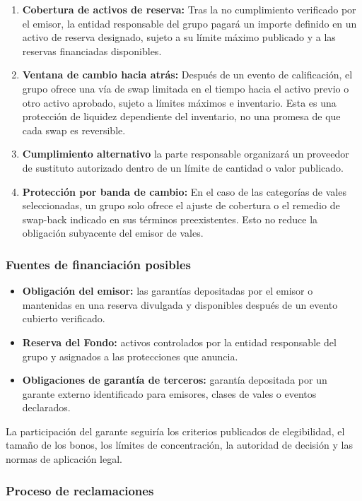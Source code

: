 \documentclass[11pt]{article}
\begin{document}
\begin{enumerate}[leftmargin=*]
\item \textbf{Cobertura de activos de reserva:} Tras la no cumplimiento verificado por el emisor, la entidad responsable del grupo pagará un importe definido en un activo de reserva designado, sujeto a su límite máximo publicado y a las reservas financiadas disponibles.
\item \textbf{Ventana de cambio hacia atrás:} Después de un evento de calificación, el grupo ofrece una vía de swap limitada en el tiempo hacia el activo previo o otro activo aprobado, sujeto a límites máximos e inventario. Esta es una protección de liquidez dependiente del inventario, no una promesa de que cada swap es reversible.
\item \textbf{Cumplimiento alternativo} la parte responsable organizará un proveedor de sustituto autorizado dentro de un límite de cantidad o valor publicado.
\item \textbf{Protección por banda de cambio:} En el caso de las categorías de vales seleccionadas, un grupo solo ofrece el ajuste de cobertura o el remedio de swap-back indicado en sus términos preexistentes. Esto no reduce la obligación subyacente del emisor de vales.
\end{enumerate}
\subsubsection*{Fuentes de financiación posibles}

\begin{itemize}[leftmargin=*]
\item \textbf{Obligación del emisor:} las garantías depositadas por el emisor o mantenidas en una reserva divulgada y disponibles después de un evento cubierto verificado.
\item \textbf{Reserva del Fondo:} activos controlados por la entidad responsable del grupo y asignados a las protecciones que anuncia.
\item \textbf{Obligaciones de garantía de terceros:} garantía depositada por un garante externo identificado para emisores, clases de vales o eventos declarados.
\end{itemize}
La participación del garante seguiría los criterios publicados de elegibilidad, el tamaño de los bonos, los límites de concentración, la autoridad de decisión y las normas de aplicación legal.

\subsubsection*{Proceso de reclamaciones}
\end{document}
